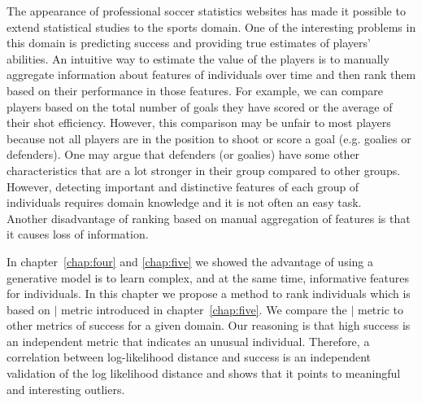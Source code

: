 The appearance of professional soccer statistics websites has made it possible to extend statistical studies to the sports domain. One of the interesting problems in this domain is predicting success and providing true estimates of players' abilities. 
An intuitive way to estimate the value of the players is to manually aggregate information about features of individuals over time and then rank them based on their performance in those features. For example, we can compare players based on the total number of goals they have scored or the average of their shot efficiency. However, this comparison may be unfair to most players because not all players are in the position to shoot or score a goal (e.g. goalies or defenders). One may argue that defenders (or goalies) have some other characteristics that are a lot stronger in their group compared to other groups. However, detecting important and distinctive features of each group of individuals requires domain knowledge and it is not often an easy task.  \\
Another disadvantage of ranking based on manual aggregation of features is that it causes loss of information.
 
 In chapter~\ref{chap:four} and \ref{chap:five} we showed the advantage of using a generative model is to learn complex, and at the same time, informative features for individuals. 
In this chapter we propose a method to rank individuals which is based on $\mid$ metric introduced in chapter~\ref{chap:five}. We compare the $\mid$ metric to other metrics of success for a given domain. Our reasoning is that high success is an independent metric that indicates an unusual individual. Therefore, a correlation between log-likelihood distance and success is an independent validation of the log likelihood distance and shows that it points to meaningful and interesting outliers. 
